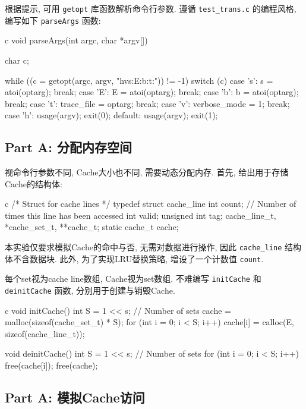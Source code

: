 根据提示, 可用 \verb|getopt| 库函数解析命令行参数. 遵循 \verb|test_trans.c| 的编程风格, 编写如下 \verb|parseArgs| 函数:
\begin{code}{c}
void parseArgs(int argc, char *argv[]) {
  char c;

  while ((c = getopt(argc, argv, "hvs:E:b:t:")) != -1) {
    switch (c) {
    case 's':
      s = atoi(optarg);
      break;
    case 'E':
      E = atoi(optarg);
      break;
    case 'b':
      b = atoi(optarg);
      break;
    case 't':
      trace_file = optarg;
      break;
    case 'v':
      verbose_mode = 1;
      break;
    case 'h':
      usage(argv);
      exit(0);
    default:
      usage(argv);
      exit(1);
    }
  }
}
\end{code}

\subsection{Part A: 分配内存空间}

视命令行参数不同, Cache大小也不同, 需要动态分配内存. 首先, 给出用于存储Cache的结构体:
\begin{code}{c}
/* Struct for cache lines */
typedef struct cache_line {
  int count; // Number of times this line has been accessed
  int valid;
  unsigned int tag;
} cache_line_t, *cache_set_t, **cache_t;
static cache_t cache;
\end{code}

本实验仅要求模拟Cache的命中与否, 无需对数据进行操作, 因此 \verb|cache_line| 结构体不含数据块. 此外, 为了实现LRU替换策略, 增设了一个计数值 \verb|count|. 

每个set视为cache line数组, Cache视为set数组. 不难编写 \verb|initCache| 和 \verb|deinitCache| 函数, 分别用于创建与销毁Cache.

\begin{code}{c}
void initCache() {
  int S = 1 << s; // Number of sets
  cache = malloc(sizeof(cache_set_t) * S);
  for (int i = 0; i < S; i++)
    cache[i] = calloc(E, sizeof(cache_line_t));
}

void deinitCache() {
  int S = 1 << s; // Number of sets
  for (int i = 0; i < S; i++)
    free(cache[i]);
  free(cache);
}
\end{code}

\subsection{Part A: 模拟Cache访问}

